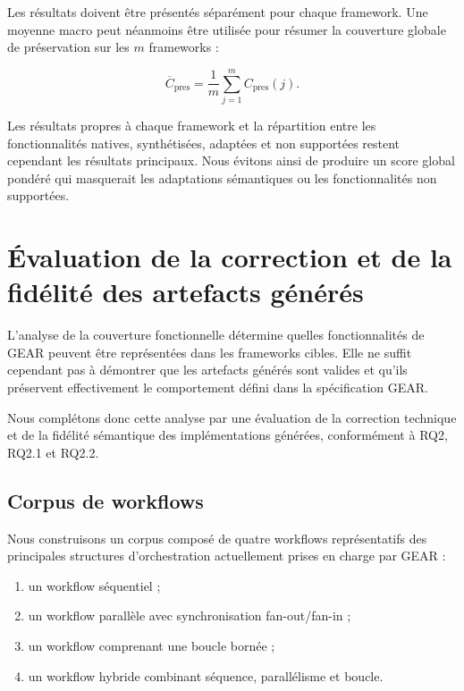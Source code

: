 Les résultats doivent être présentés séparément pour chaque framework.
Une moyenne macro peut néanmoins être utilisée pour résumer la
couverture globale de préservation sur les $m$ frameworks :

\begin{equation}
\overline{C}_{\mathrm{pres}}
=
\frac{1}{m}
\sum_{j=1}^{m} C_{\mathrm{pres}}(j).
\label{eq:couverture-preservation-moyenne}
\end{equation}

Les résultats propres à chaque framework et la répartition entre les
fonctionnalités natives, synthétisées, adaptées et non supportées
restent cependant les résultats principaux. Nous évitons ainsi de
produire un score global pondéré qui masquerait les adaptations
sémantiques ou les fonctionnalités non supportées.


\section{Évaluation de la correction et de la fidélité des artefacts générés}
\label{sec:correction-fidelite}

L'analyse de la couverture fonctionnelle détermine quelles
fonctionnalités de GEAR peuvent être représentées dans les frameworks
cibles. Elle ne suffit cependant pas à démontrer que les artefacts
générés sont valides et qu'ils préservent effectivement le comportement
défini dans la spécification GEAR.

Nous complétons donc cette analyse par une évaluation de la correction
technique et de la fidélité sémantique des implémentations générées,
conformément à RQ2, RQ2.1 et RQ2.2.


\subsection{Corpus de workflows}
\label{subsec:corpus-workflows}

Nous construisons un corpus composé de quatre workflows représentatifs
des principales structures d'orchestration actuellement prises en
charge par GEAR :

\begin{enumerate}
    \item un workflow séquentiel ;
    \item un workflow parallèle avec synchronisation fan-out/fan-in ;
    \item un workflow comprenant une boucle bornée ;
    \item un workflow hybride combinant séquence, parallélisme et
    boucle.
\end{enumerate}

